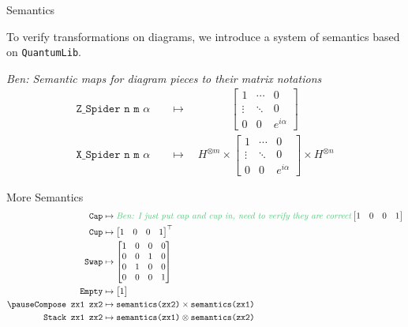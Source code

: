 \documentclass{beamer}
\newcommand{\QLib}{\texttt{QuantumLib}\xspace}
\newcommand{\ben}[1]{\textit{\textcolor{egreen}{Ben: #1}}}
\newcommand{\ben}[1]{}
\begin{document}
\begin{frame}{Semantics}

    To verify transformations on diagrams, we introduce a \alert{system of semantics} based on \QLib.
    
    \ben{Semantic maps for diagram pieces to their matrix notations}
    \begin{align*}
        \texttt{Z_Spider n m }\alpha \quad &\mapsto \hspace{47pt}
        \begin{bmatrix} 
            1 & \dotsi & 0 \\ 
            \vdots & \ddots & 0 \\ 
            0 & 0 & e^{i\alpha}
        \end{bmatrix}
    \\
    \texttt{X_Spider n m }\alpha  \quad &\mapsto \quad H^{\otimes m} \times 
        \begin{bmatrix} 
            1 & \dotsi & 0 \\ 
            \vdots & \ddots & 0 \\ 
            0 & 0 & e^{i\alpha}
        \end{bmatrix} \times H^{\otimes n}
    \end{align*}
\end{frame}
    
\begin{frame}{More Semantics}
    \begin{align*}
        \texttt{Cap} &\mapsto \ben{I just put cap and cup in, need to verify they are correct}
        \begin{bmatrix} 
            1 & 0 & 0 & 1
        \end{bmatrix}
    \\
        \texttt{Cup} &\mapsto 
        \begin{bmatrix} 
            1 & 0 & 0 & 1
        \end{bmatrix}^\top
    \\
        \texttt{Swap} &\mapsto
        \begin{bmatrix}
            1 & 0 & 0 & 0 \\
            0 & 0 & 1 & 0 \\
            0 & 1 & 0 & 0 \\
            0 & 0 & 0 & 1
        \end{bmatrix}
    \\
        \texttt{Empty} &\mapsto
        \begin{bmatrix}
            1
        \end{bmatrix}
    \\\pause      
        \texttt{Compose zx1 zx2} &\mapsto 
        \texttt{semantics(zx2)} \times \texttt{semantics(zx1)}
    \\
        \texttt{Stack zx1 zx2} &\mapsto
        \texttt{semantics(zx1)} \otimes \texttt{semantics(zx2)}
    \end{align*}
\end{frame}
\end{document}
